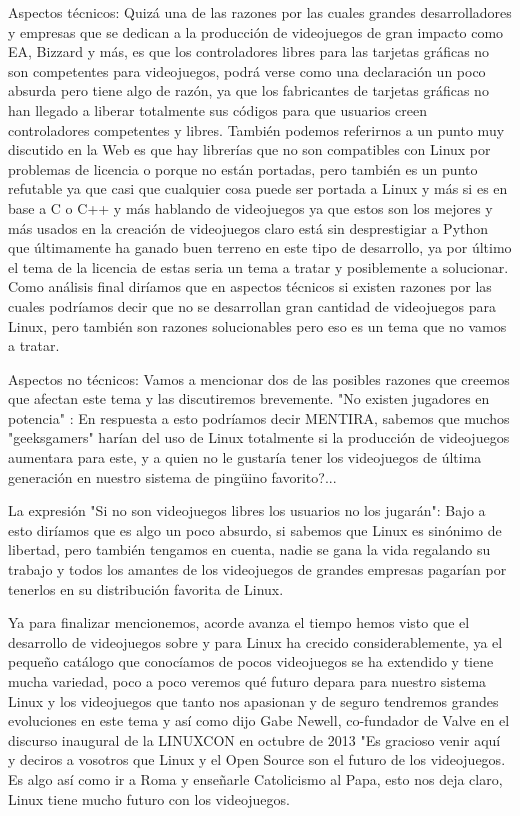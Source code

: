 Aspectos técnicos: Quizá una de las razones por las cuales
grandes desarrolladores y empresas que se dedican a la
producción de videojuegos de gran impacto como EA, Bizzard y
más, es que los controladores libres para las tarjetas gráficas
no son competentes para videojuegos, podrá verse como una
declaración un poco absurda pero tiene algo de razón, ya que los
fabricantes de tarjetas gráficas no han llegado a liberar
totalmente sus códigos para que usuarios creen controladores
competentes y libres. También podemos referirnos a un punto
muy discutido en la Web es que hay librerías que no son
compatibles con Linux por problemas de licencia o porque no
están portadas, pero también es un punto refutable ya que casi
que cualquier cosa puede ser portada a Linux y más si es en
base a C o C++ y más hablando de videojuegos ya que estos son
los mejores y más usados en la creación de videojuegos claro
está sin desprestigiar a Python que últimamente ha ganado buen
terreno en este tipo de desarrollo, ya por último el tema de la
licencia de estas seria un tema a tratar y posiblemente a
solucionar. Como análisis final diríamos que en aspectos técnicos
si existen razones por las cuales podríamos decir que no se
desarrollan gran cantidad de videojuegos para Linux, pero
también son razones solucionables pero eso es un tema que no
vamos a tratar.

Aspectos no técnicos: Vamos a mencionar dos de las posibles
razones que creemos que afectan este tema y las discutiremos
brevemente.
"No existen jugadores en potencia" : En respuesta a esto
podríamos decir MENTIRA, sabemos que muchos "geeksgamers"
harían del uso de Linux totalmente si la producción de
videojuegos aumentara para este, y a quien no le gustaría tener
los videojuegos de última generación en nuestro sistema de
pingüino favorito?...

La expresión "Si no son videojuegos libres los usuarios no los
jugarán": Bajo a esto diríamos que es algo un poco absurdo, si
sabemos que Linux es sinónimo de libertad, pero también
tengamos en cuenta, nadie se gana la vida regalando su trabajo
y todos los amantes de los videojuegos de grandes empresas
pagarían por tenerlos en su distribución favorita de Linux.

Ya para finalizar mencionemos, acorde avanza el tiempo hemos
visto que el desarrollo de videojuegos sobre y para Linux ha
crecido considerablemente, ya el pequeño catálogo que
conocíamos de pocos videojuegos se ha extendido y tiene mucha
variedad, poco a poco veremos qué futuro depara para nuestro
sistema Linux y los videojuegos que tanto nos apasionan y de
seguro tendremos grandes evoluciones en este tema y así como
dijo Gabe Newell, co-fundador de Valve en el discurso inaugural
de la LINUXCON en octubre de 2013 "Es gracioso venir aquí y
deciros a vosotros que Linux y el Open Source son el futuro de
los videojuegos. Es algo así como ir a Roma y enseñarle
Catolicismo al Papa, esto nos deja claro, Linux tiene mucho
futuro con los videojuegos.


